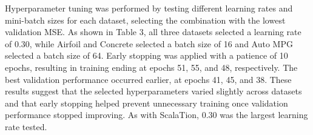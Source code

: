 \documentclass{article}
\begin{document}
Hyperparameter tuning was performed by testing different learning rates and mini-batch sizes for each dataset, selecting the combination with the lowest validation MSE. As shown in Table 3, all three datasets selected a learning rate of 0.30, while Airfoil and Concrete selected a batch size of 16 and Auto MPG selected a batch size of 64. Early stopping was applied with a patience of 10 epochs, resulting in training ending at epochs 51, 55, and 48, respectively. The best validation performance occurred earlier, at epochs 41, 45, and 38. These results suggest that the selected hyperparameters varied slightly across datasets and that early stopping helped prevent unnecessary training once validation performance stopped improving. As with ScalaTion, 0.30 was the largest learning rate tested.
\medskip
\begin{table}[H]
    \centering
    \caption{PyTorch 2L Neural Network Quality of Fit Results}
    \label{tab:pytorch_qof}
    \small
\end{table}
\end{document}
